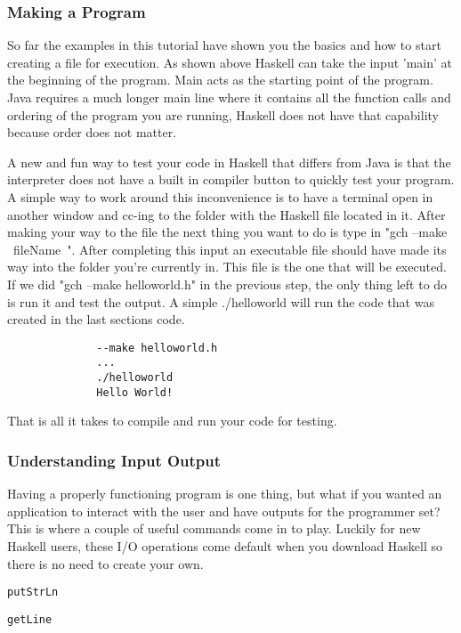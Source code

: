 \documentclass{article}
\begin{document}
    \subsubsection{Making a Program}
    So far the examples in this tutorial have shown you the basics and how to start creating a file for execution. As shown above Haskell can take the input 'main' at the beginning of the program. Main acts as the starting point of the program. Java requires a much longer main line where it contains all the function calls and ordering of the program you are running, Haskell does not have that capability because order does not matter. 
    
    \medskip A new and fun way to test your code in Haskell that differs from Java is that the interpreter does not have a built in compiler button to quickly test your program. A simple way to work around this inconvenience is to have a terminal open in another window and cc-ing to the folder with the Haskell file located in it. After making your way to the file the next thing you want to do is type in "gch --make ~fileName~". After completing this input an executable file should have made its way into the folder you're currently in. This file is the one that will be executed. If we did "gch --make helloworld.h" in the previous step, the only thing left to do is run it and test the output. A simple ./helloworld will run the code that was created in the last sections code. 
    
    \begin{lstlisting}
              --make helloworld.h
              ...
              ./helloworld
              Hello World!
    \end{lstlisting}
    
    \noindent That is all it takes to compile and run your code for testing.
    
    \medskip
    \subsubsection{Understanding Input Output}
    Having a properly functioning program is one thing, but what if you wanted an application to interact with the user and have outputs for the programmer set? This is where a couple of useful commands come in to play. Luckily for new Haskell users, these I/O operations come default when you download Haskell so there is no need to create your own.  
    
    \lstinline{putStrLn}
    
    \smallskip
    \lstinline{getLine}
    
\end{document}
